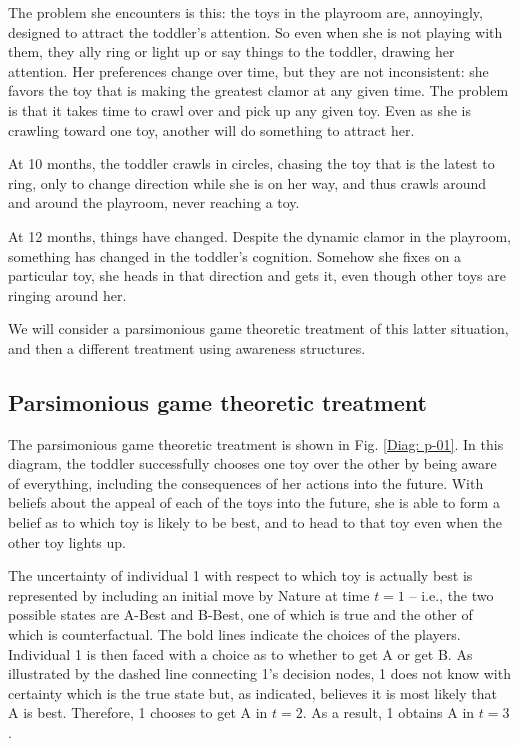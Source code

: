 \documentclass[
11pt,
titlepage,
reqno,
]{article}%
\theoremstyle{definition}
\begin{document}
The problem she encounters is this: the toys in the playroom are, annoyingly, designed to attract the toddler's attention. So even when she is not playing with them, they ally ring or light up or say things to the toddler, drawing her attention. Her preferences change over time, but they are not inconsistent: she favors the toy that is making the greatest clamor at any given time. The problem is that it takes time to crawl over and pick up any given toy. Even as she is crawling toward one toy, another will do something to attract her.

At 10 months, the toddler crawls in circles, chasing the toy that is the latest to ring, only to change direction while she is on her way, and thus crawls around and around the playroom, never reaching a toy.

At 12 months, things have changed. Despite the dynamic clamor in the playroom, something has changed in the toddler's cognition. Somehow she fixes on a particular toy, she heads in that direction and gets it, even though other toys are ringing around her.

We will consider a parsimonious game theoretic treatment of this latter situation, and then a different treatment using awareness structures.


\subsection{Parsimonious game theoretic treatment}
The parsimonious game theoretic treatment is shown in Fig. \ref{Diag: p-01}. In this diagram, the toddler successfully chooses one toy over the other by being aware of everything, including the consequences of her actions into the future. With beliefs about the appeal of each of the toys into the future, she is able to form a belief as to which toy is likely to be best, and to head to that toy even when the other toy lights up.

The uncertainty of individual 1 with respect to which toy is actually best is represented by including an initial move by Nature at time $t=1$ -- i.e., the two possible states are A-Best and B-Best, one of which is true and the other of which is counterfactual. The bold lines indicate the choices of the players. Individual 1 is then faced with a choice as to whether to get A or get B. As illustrated by the dashed line connecting 1's decision nodes, 1 does not know with certainty which is the true state but, as indicated, believes it is most likely that A is best. Therefore, 1 chooses to get A in $t=2$. As a result, 1 obtains A in $t=3$.
\end{document}
